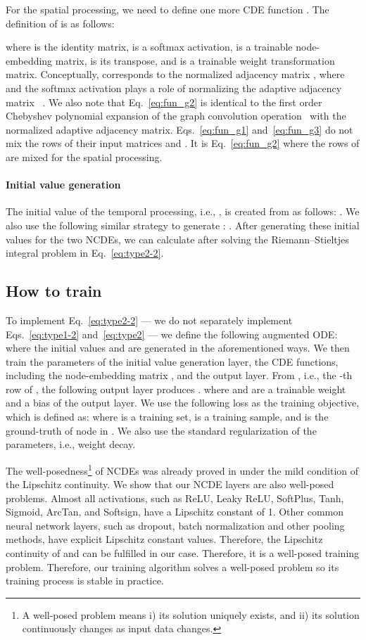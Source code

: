 \documentclass[letterpaper]{article} \usepackage{aaai22}  \usepackage{times}  \usepackage{helvet}  \usepackage{courier}  \usepackage[hyphens]{url}  \usepackage{graphicx} \urlstyle{rm} \def\UrlFont{\rm}  \usepackage{natbib}  \usepackage{caption} \DeclareCaptionStyle{ruled}{labelfont=normalfont,labelsep=colon,strut=off} \frenchspacing  \setlength{\pdfpagewidth}{8.5in}  \setlength{\pdfpageheight}{11in}  \usepackage{stfloats}
\begin{document}
For the spatial processing, we need to define one more CDE function . The definition of  is as follows:

where  is the  identity matrix,  is a softmax activation,  is a trainable node-embedding matrix,  is its transpose, and  is a trainable weight transformation matrix. Conceptually,  corresponds to the normalized adjacency matrix , where  and the softmax activation plays a role of normalizing the adaptive adjacency matrix ~\cite{wu2019graphwavenet,NEURIPS2020_ce1aad92}. We also note that Eq.~\eqref{eq:fun_g2} is identical to the first order Chebyshev polynomial expansion of the graph convolution operation~\cite{kipf2017semi} with the normalized adaptive adjacency matrix. Eqs.~\eqref{eq:fun_g1} and~\eqref{eq:fun_g3} do not mix the rows of their input matrices  and . It is Eq.~\eqref{eq:fun_g2} where the rows of  are mixed for the spatial processing.

\paragraph{Initial value generation} The initial value of the temporal processing, i.e., , is created from  as follows: . We also use the following similar strategy to generate : . After generating these initial values for the two NCDEs, we can calculate  after solving the Riemann--Stieltjes integral problem in Eq.~\eqref{eq:type2-2}.

\subsection{How to train}
To implement Eq.~\eqref{eq:type2-2} --- we do not separately implement Eqs.~\eqref{eq:type1-2} and~\eqref{eq:type2} --- we define the following augmented ODE:
where the initial values  and  are generated in the aforementioned ways. We then train the parameters of the initial value generation layer, the CDE functions, including the node-embedding matrix , and the output layer. From , i.e., the -th row of , the following output layer produces .
where  and  are a trainable weight and a bias of the output layer. We use the following  loss as the training objective, which is defined as:
where  is a training set,  is a training sample, and  is the ground-truth of node  in . We also use the standard  regularization of the parameters, i.e., weight decay.

The well-posedness\footnote{A well-posed problem means i) its solution uniquely exists, and ii) its solution continuously changes as input data changes.} of NCDEs was already proved in \cite[Theorem 1.3]{lyons2007differential} under the mild condition of the Lipschitz continuity. We show that our NCDE layers are also well-posed problems. Almost all activations, such as ReLU, Leaky ReLU, SoftPlus, Tanh, Sigmoid, ArcTan, and Softsign, have a Lipschitz constant of 1. Other common neural network layers, such as dropout, batch normalization and other pooling methods, have explicit Lipschitz constant values. Therefore, the Lipschitz continuity of  and  can be fulfilled in our case. Therefore, it is a well-posed training problem. Therefore, our training algorithm solves a well-posed problem so its training process is stable in practice.
\end{document}
